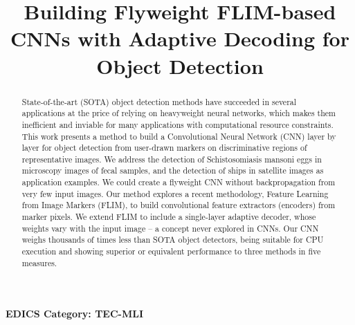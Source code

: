 \documentclass[10pt,twocolumn,twoside]{IEEEtran}
\begin{document}
\title{Building Flyweight FLIM-based CNNs with Adaptive Decoding for Object Detection}

\author{
 
 
 

}

\maketitle
\begin{center} \bfseries EDICS Category: TEC-MLI \end{center}

\begin{abstract}
State-of-the-art (SOTA) object detection methods have succeeded in several applications at the price of relying on heavyweight neural networks, which makes them inefficient and inviable for many applications with computational resource constraints. This work presents a method to build a Convolutional Neural Network (CNN) layer by layer for object detection from user-drawn markers on discriminative regions of representative images. We address the detection of Schistosomiasis mansoni eggs in microscopy images of fecal samples, and the detection of ships in satellite images as application examples. We could create a flyweight CNN without backpropagation from very few input images. Our method explores a recent methodology, Feature Learning from Image Markers (FLIM), to build convolutional feature extractors (encoders) from marker pixels. We extend FLIM to include a single-layer adaptive decoder, whose weights vary with the input image -- a concept never explored in CNNs. Our CNN weighs thousands of times less than SOTA object detectors, being suitable for CPU execution and showing superior or equivalent performance to three methods in five measures.
\end{abstract}
\end{document}
